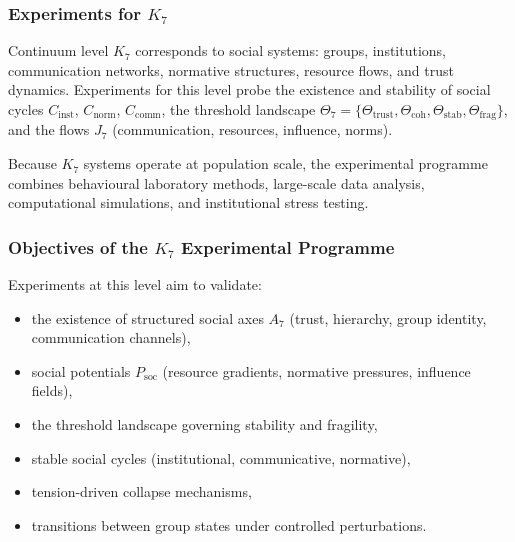 
\subsubsection{Experiments for \texorpdfstring{$K_7$}{K_7}}
\label{sec:experiments-k7}

Continuum level $K_7$ corresponds to social systems:
groups, institutions, communication networks, normative structures,
resource flows, and trust dynamics.
Experiments for this level probe the existence and stability of
social cycles $C_{\mathrm{inst}}$, $C_{\mathrm{norm}}$,
$C_{\mathrm{comm}}$, the threshold landscape
$\Theta_7 = \{\Theta_{\mathrm{trust}}, \Theta_{\mathrm{coh}},
\Theta_{\mathrm{stab}}, \Theta_{\mathrm{frag}}\}$,
and the flows $J_7$ (communication, resources, influence, norms).

Because $K_7$ systems operate at population scale, the
experimental programme combines behavioural laboratory methods,
large-scale data analysis, computational simulations, and
institutional stress testing.



\subsubsection{Objectives of the \texorpdfstring{$K_7$}{K_7} Experimental Programme}

Experiments at this level aim to validate:

\begin{itemize}
    \item the existence of structured social axes $A_7$
          (trust, hierarchy, group identity, communication channels),
    \item social potentials $P_{\mathrm{soc}}$ (resource gradients,
          normative pressures, influence fields),
    \item the threshold landscape governing stability and fragility,
    \item stable social cycles (institutional, communicative, normative),
    \item tension-driven collapse mechanisms,
    \item transitions between group states under controlled perturbations.
\end{itemize}



